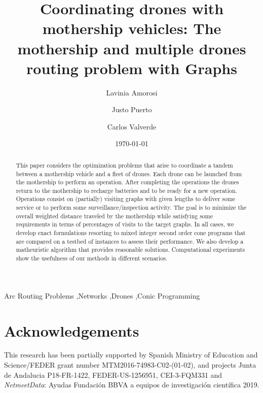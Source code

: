 \documentclass[10pt,a4paper]{elsarticle}
\title{Coordinating drones with mothership vehicles: The mothership and multiple drones routing problem with Graphs}
\author[1]{Lavinia Amorosi\corref{cor1}}
\author[2]{Justo Puerto\corref{cor1}}
\author[2]{Carlos Valverde\corref{cor1}}
\date{\today}
\begin{document}
\begin{abstract}
This paper considers the optimization problems that arise to coordinate a tandem between a mothership vehicle and a fleet of drones. %
Each drone can be launched from the mothership to perform an operation. After completing the operations the drones return to the mothership to recharge batteries and to be ready for a new operation. Operations consist on (partially) visiting graphs with given lengths to deliver some service or to perform some surveillance/inspection activity.  The goal is to minimize the overall weighted distance traveled by the mothership while satisfying some requirements in terms of percentages of visits to the target graphs. In all cases, we develop exact formulations resorting to mixed integer second order cone programs that are compared on a testbed of instances to assess their performance. We also develop a matheuristic algorithm that provides reasonable solutions.  Computational experiments show the usefulness of our methods in different scenarios. 
\end{abstract}

\begin{keyword}
Arc Routing Problems \sep Networks \sep Drones \sep Conic Programming
\end{keyword}


\maketitle



%




% 



\section*{Acknowledgements}
This research has been partially supported by Spanish Ministry of Education and Science/FEDER grant number  MTM2016-74983-C02-(01-02), and projects Junta de Andalucia P18-FR-1422, FEDER-US-1256951, CEI-3-FQM331 and  \textit{NetmeetData}: Ayudas Fundaci\'on BBVA a equipos de investigaci\'on cient\'ifica 2019.

% 




\end{document}
